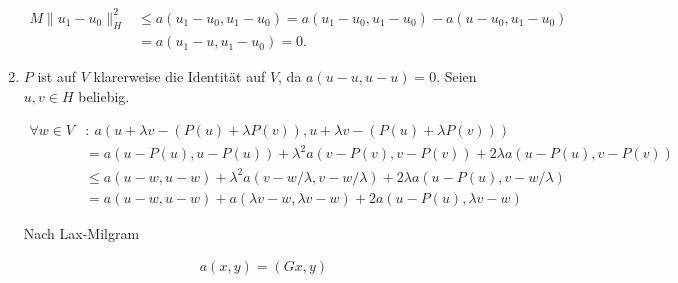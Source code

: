 \begin{solution}
\begin{enumerate}[label = \textbf{\alph*)}]
  \begin{align*}
    M\|u_1-u_0\|_H^2 &\leq a(u_1 - u_0, u_1 - u_0) = a(u_1 - u_0, u_1 - u_0) - a(u - u_0, u_1 - u_0) \\
    &= a(u_1 -u, u_1 - u_0) = 0.
  \end{align*}
  
  \item $P$ ist auf $V$ klarerweise die Identität auf $V$, da $a(u-u,u-u) = 0$.
  Seien $u,v \in H$ beliebig.

  \begin{align*}
    \forall w \in V&:~a(u + \lambda v - (P(u) + \lambda P(v)),u + \lambda v - (P(u) + \lambda P(v))) \\
    &= a(u - P(u), u - P(u)) + \lambda^2a(v - P(v), v - P(v)) +
    2\lambda a(u - P(u), v - P(v))\\
    &\leq a(u - w, u - w) + \lambda^2a(v - w/\lambda, v - w/\lambda)
    + 2\lambda a(u - P(u), v - w/\lambda) \\
    &= a(u - w, u - w) + a(\lambda v - w, \lambda v - w)
    + 2 a(u - P(u),\lambda v - w)
  \end{align*}

  Nach Lax-Milgram

  \begin{align*}
    a(x,y) = (Gx,y)
  \end{align*}

\end{enumerate}

\end{solution}


